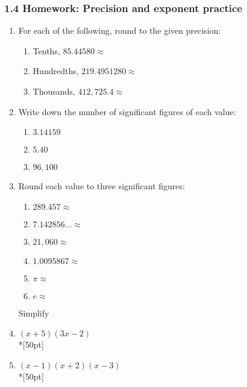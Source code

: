 \documentclass[12pt, twoside]{article}
\begin{document}
\subsubsection*{1.4 Homework: Precision and exponent practice}

\begin{enumerate}
  \item For each of the following, round to the given precision:
  \begin{enumerate}
    \item Tenths, $85.44580 \approx$ \vspace{0.5cm}
    \item Hundredths, $219.4951280 \approx$ \vspace{0.5cm}
    \item Thousands, $412,725.4 \approx$ \vspace{0.5cm}
  \end{enumerate}
  \item Write down the number of significant figures of each value:
  \begin{enumerate}
    \item $3.14159$ \vspace{0.5cm}
    \item $5.40$ \vspace{0.5cm}
    \item $96,100$ \vspace{0.5cm}
  \end{enumerate}
  \item Round each value to three significant figures:
  \begin{enumerate}
    \item $289.457 \approx$ \vspace{0.75cm}
    \item $7.142856\ldots \approx$ \vspace{0.75cm}
    \item $21,060 \approx$ \vspace{0.75cm}
    \item $1.0095867 \approx$ \vspace{0.75cm}
    \item $\pi \approx$ \vspace{0.75cm}
    \item $e \approx$
  \end{enumerate}
  
\newpage

Simplify

  \item $(x +5)(3x-2)$\\*[50pt]
  \item $(x -1)(x+2)(x-3)$\\*[50pt]


\end{enumerate}
\end{document}
